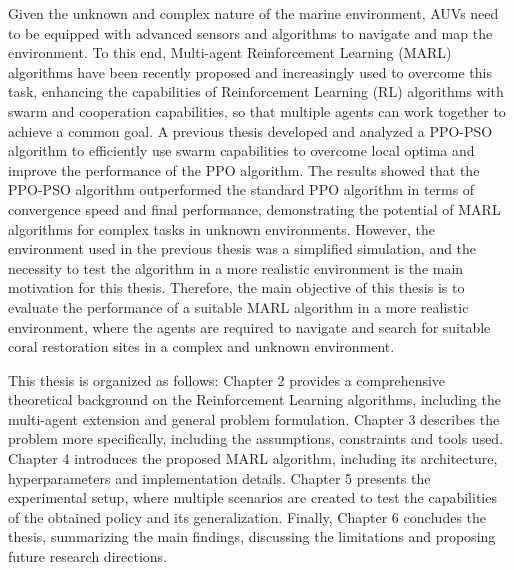 Given the unknown and complex nature of the marine environment, AUVs need to be equipped with
advanced sensors and algorithms to navigate and map the environment. To this end, Multi-agent 
Reinforcement Learning (MARL) algorithms have been recently proposed and increasingly used to overcome
this task, enhancing the capabilities of Reinforcement Learning (RL) algorithms with swarm and cooperation 
capabilities, so that multiple agents can work together to achieve a common goal. A previous thesis \cite{insaghi2025thesis}
developed and analyzed a PPO-PSO algorithm to efficiently use swarm capabilities to overcome 
local optima and improve the performance of the PPO algorithm. The results showed that the PPO-PSO 
algorithm outperformed the standard PPO algorithm in terms of convergence speed and final performance, 
demonstrating the potential of MARL algorithms for complex tasks in unknown environments. However,
the environment used in the previous thesis was a simplified simulation, and the necessity to test 
the algorithm in a more realistic environment is the main motivation for this thesis. Therefore,
the main objective of this thesis is to evaluate the performance of a suitable MARL algorithm in a 
more realistic environment, where the agents are required to navigate and search for suitable 
coral restoration sites in a complex and unknown environment.

This thesis is organized as follows: Chapter 2 provides a comprehensive theoretical background on the 
Reinforcement Learning algorithms, including the multi-agent extension and general problem formulation. Chapter 3 
describes the problem more specifically, including the assumptions, constraints and tools used. Chapter 4 
introduces the proposed MARL algorithm, including its architecture, hyperparameters and implementation details.
Chapter 5 presents the experimental setup, where multiple scenarios are created to test the capabilities 
of the obtained policy and its generalization. Finally, Chapter 6 concludes the thesis,
summarizing the main findings, discussing the limitations and proposing future research directions.